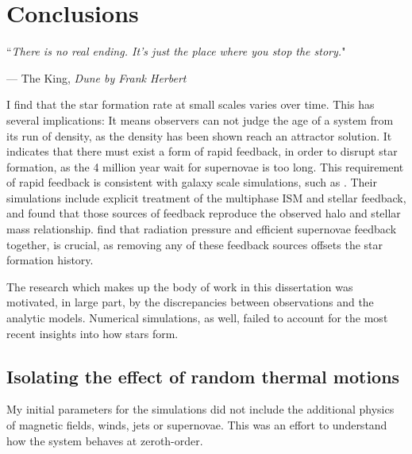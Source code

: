 \documentclass[../dissertation.tex]{subfiles}
\begin{document}
\chapter{Conclusions}
\label{ch:conclusions}

\singlespace
\epigraph{``\emph{There is no real ending. It's just the place where you stop the story.}"}{--- \textup{The King}, \textit{Dune by Frank Herbert}}

\dblspace

I find that the star formation rate at small scales varies over time.
This has several implications: It means observers can not judge the age of a system from its run of density,
as the density has been shown reach an attractor solution.
It indicates that there must exist a form of rapid feedback, in order to disrupt star formation, as the 4 million year wait for supernovae is too long.
This requirement of rapid feedback is consistent with galaxy scale simulations, such as \citet{2014MNRAS.445..581H}. 
Their simulations include explicit treatment of the multiphase ISM and stellar feedback, and
\citet{2014MNRAS.445..581H} found that those sources of feedback reproduce the observed halo and stellar mass relationship.
\citet{2015ApJ...804...18A} find that radiation pressure and efficient supernovae feedback together, is crucial, as removing any of these feedback sources offsets
the star formation history.

The research which makes up the body of work in this dissertation was motivated, in large part, 
by the discrepancies between observations and the analytic models. 
Numerical simulations, as well, failed to account for the most recent insights into how stars form. 

\section{Isolating the effect of random thermal motions}
My initial parameters for the simulations did not include the additional physics of magnetic fields, winds, jets or supernovae. 
This was an effort to understand how the system behaves at zeroth-order. 
\end{document}
